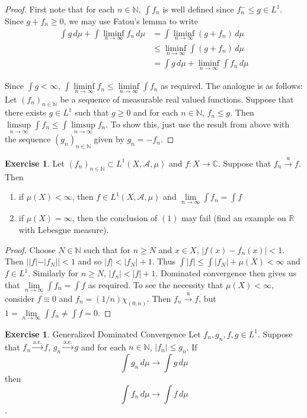 \documentclass[12pt]{amsart}
\theoremstyle{definition}
\newtheorem{ex}[definition]{Exercise}
\newcommand{\C}{\mathbb{C}}
\newcommand{\N}{\mathbb{N}}
\newcommand{\R}{\mathbb{R}}
\newcommand{\MA}{\mathcal{A}}
\newcommand{\dmu}{\, d \mu}
\newcommand{\limfn}{\liminf \limits_{n \rightarrow \infty}}
\newcommand{\limpn}{\limsup \limits_{n \rightarrow \infty}}
\newcommand{\limn}{\lim \limits_{n \rightarrow \infty}}
\newcommand{\lex}[1]{\label{ex:#1}}
\begin{document}
	\begin{proof}
		First note that for each $n \in \N$, $\int f_n$ is well defined since $f_n^- \leq g \in L^1$. Since $g + f_n \geq 0$, we may use Fatou's lemma to write
		\begin{align*}
			\int g \dmu + \int \limfn f_n \dmu 
			&= \int \limfn (g+f_n)  \dmu \\
			& \leq \limfn \int (g + f_n) \dmu \\
			&= \int g \dmu + \limfn \int f_n \dmu 
		\end{align*}
		
		Since $\int g < \infty$, $\int \limfn f_n \leq \limfn \int f_n$ as required. The analogue is as follows: Let $(f_n)_{n \in \N}$ be a sequence of measurable real valued functions. Suppose that there exists $g \in L^1$ such that $g \geq 0$ and for each $n \in \N$, $f_n \leq g$. Then $\limpn \int f_n \leq \int \limpn f_n$. To show this, just use the result from above with the sequence $(g_n)_{n \in \N}$ given by $g_n = -f_n$.
		
	\end{proof}
	
	\begin{ex} \lex{00000} 
		Let $(f_n)_{n \in \N} \subset L^1(X, \MA, \mu)$ and $f:X \rightarrow \C$. Suppose that $f_n \xrightarrow{\text{u}} f$. Then 
		\begin{enumerate}
			\item if $\mu(X) < \infty$, then $f \in L^1(X, \MA, \mu)$ and $\limn \int f_n = \int f$
			\item if $\mu(X) = \infty$, then the conclusion of $(1)$ may fail (find an example on $\R$ with Lebesgue measure).
		\end{enumerate}
	\end{ex}
	
	\begin{proof}
		Choose $N \in \N$ such that for $n \geq N$ and $x \in X$, $|f(x) - f_n(x)| < 1$. Then $||f| - |f_N|| < 1$ and so $|f| < |f_N| +1$. Thus $\int |f| \leq \int |f_N| +\mu(X) < \infty$ and $f \in L^1$. Similarly for $n \geq N$, $|f_n| < |f|+ 1$. Dominated convergence then gives us that $\limn \int f_n = \int f$ as required. To see the necessity that $\mu(X) < \infty$, consider $f \equiv 0$ and $f_n = (1/n) \chi_{(0,n)}$. Then $f_n \xrightarrow{\text{u}} f$, but $1 = \limn \int f_n \neq \int f = 0$.  
	\end{proof}
	
	\begin{ex} \lex{00000} {Generalized Dominated Convergence}
		Let $f_n,g_n,f,g \in L^1$. Suppose that $f_n \xrightarrow{\text{a.e.}} f$, $g_n \xrightarrow{\text{a.e.}} g$ and for each $n \in \N$, $|f_n| \leq g_n$. If $$\int g_n \dmu \rightarrow \int g \dmu $$ then $$\int f_n \dmu \rightarrow \int f \dmu$$.
	\end{ex}
	
\end{document}
